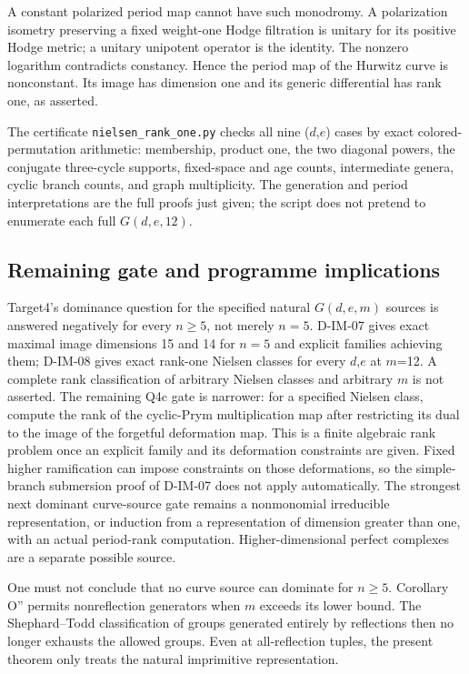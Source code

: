 A constant polarized period map cannot have such monodromy. A polarization isometry preserving a fixed weight-one Hodge filtration is unitary for its positive Hodge metric; a unitary unipotent operator is the identity. The nonzero logarithm contradicts constancy. Hence the period map of the Hurwitz curve is nonconstant. Its image has dimension one and its generic differential has rank one, as asserted.

The certificate \texttt{nielsen\_rank\_one.py} checks all nine (\(d\),\(e\)) cases by exact colored-permutation arithmetic: membership, product one, the two diagonal powers, the conjugate three-cycle supports, fixed-space and age counts, intermediate genera, cyclic branch counts, and graph multiplicity. The generation and period interpretations are the full proofs just given; the script does not pretend to enumerate each full \(G(d,e,12)\).

\subsection{Remaining gate and programme implications}

Target4's dominance question for the specified natural \(G(d,e,m)\) sources is answered negatively for every \(n\geq 5\), not merely \(n= 5\). D-IM-07 gives exact maximal image dimensions 15 and 14 for \(n= 5\) and explicit families achieving them; D-IM-08 gives exact rank-one Nielsen classes for every \(d\),\(e\) at \(m\)=12. A complete rank classification of arbitrary Nielsen classes and arbitrary \(m\) is not asserted. The remaining Q4c gate is narrower: for a specified Nielsen class, compute the rank of the cyclic-Prym multiplication map after restricting its dual to the image of the forgetful deformation map. This is a finite algebraic rank problem once an explicit family and its deformation constraints are given. Fixed higher ramification can impose constraints on those deformations, so the simple-branch submersion proof of D-IM-07 does not apply automatically. The strongest next dominant curve-source gate remains a nonmonomial irreducible representation, or induction from a representation of dimension greater than one, with an actual period-rank computation. Higher-dimensional perfect complexes are a separate possible source.

One must not conclude that no curve source can dominate for \(n\geq 5\). Corollary O'' permits nonreflection generators when \(m\) exceeds its lower bound. The Shephard--Todd classification of groups generated entirely by reflections then no longer exhausts the allowed groups. Even at all-reflection tuples, the present theorem only treats the natural imprimitive representation.

